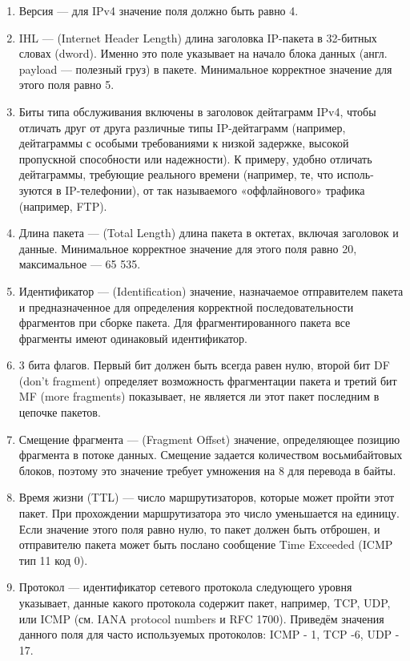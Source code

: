 \begin{enumerate}
	\item Версия — для IPv4 значение поля должно быть равно 4.
	\item IHL — (Internet Header Length) длина заголовка IP-пакета в 32-битных словах (dword). Именно это поле указывает на начало блока данных (англ. payload — полезный груз) в пакете. Минимальное корректное значение для этого поля равно 5.
	\item Биты типа обслуживания включены в заголовок дейтаграмм IPv4, чтобы отличать друг от друга различные типы IP-дейтаграмм (например, дейтаграммы с особыми требованиями к низкой задержке, высокой пропускной способности или надежности). К примеру, удобно отличать дейтаграммы, требующие реального времени (например, те, что исполь- зуются в IP-телефонии), от так называемого «оффлайнового» трафика (например, FTP).
	\item Длина пакета — (Total Length) длина пакета в октетах, включая заголовок и данные. Минимальное корректное значение для этого поля равно 20, максимальное — 65 535.
	\item Идентификатор — (Identification) значение, назначаемое отправителем пакета и предназначенное для определения корректной последовательности фрагментов при сборке пакета. Для фрагментированного пакета все фрагменты имеют одинаковый идентификатор.
	\item 3 бита флагов. Первый бит должен быть всегда равен нулю, второй бит DF (don’t fragment) определяет возможность фрагментации пакета и третий бит MF (more fragments) показывает, не является ли этот пакет последним в цепочке пакетов.
	\item Смещение фрагмента — (Fragment Offset) значение, определяющее позицию фрагмента в потоке данных. Смещение задается количеством восьмибайтовых блоков, поэтому это значение требует умножения на 8 для перевода в байты.
	\item Время жизни (TTL) — число маршрутизаторов, которые может пройти этот пакет. При прохождении маршрутизатора это число уменьшается на единицу. Если значение этого поля равно нулю, то пакет должен быть отброшен, и отправителю пакета может быть послано сообщение Time Exceeded (ICMP тип 11 код 0).
	\item Протокол — идентификатор сетевого протокола следующего уровня указывает, данные какого протокола содержит пакет, например, TCP, UDP, или ICMP (см. IANA protocol numbers и RFC 1700). Приведём значения данного поля для часто используемых протоколов: ICMP - 1, TCP -6, UDP - 17.

\end{enumerate}
